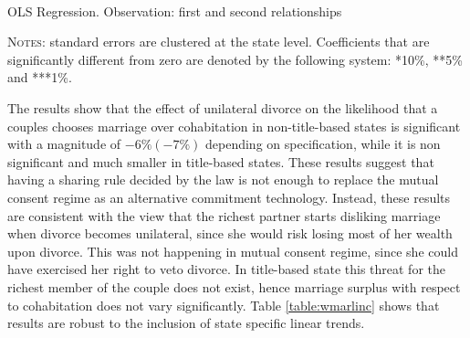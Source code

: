 \documentclass[12pt]{article}
\numberwithin{table}{section}
\begin{document}
	\begin{table}[H]\centering
		\caption{\\OLS Regression. Observation: first and second relationships}
		\label{table:wmarc}
		\begin{threeparttable}[t]\centering
			
			\begin{tablenotes}[flushleft]
				\footnotesize{\item \textsc{Notes}: standard errors are clustered at the state level.
					Coefficients that are significantly different from zero are denoted by the following system: *10\%, **5\%  and ***1\%.}
			\end{tablenotes}
		\end{threeparttable}
	\end{table}
\FloatBarrier
The results show that the effect of unilateral divorce on the likelihood that a couples chooses marriage over cohabitation in non-title-based states is significant with a magnitude of $-6\%(-7\%)$ depending on specification, while it is non significant and much smaller in title-based states. These results suggest that having a sharing rule decided by the law is not enough to replace the mutual consent regime as an alternative commitment technology. Instead, these results are consistent with the view that the richest partner starts disliking marriage when divorce becomes unilateral, since she would risk losing most of her wealth upon divorce. This was not happening in mutual consent regime, since she could have exercised her right to veto divorce. In title-based state this threat for the richest member of the couple does not exist, hence marriage surplus with respect to cohabitation does not vary significantly. Table \ref{table:wmarlinc} shows that results are robust to the inclusion of state specific linear trends.
\end{document}
